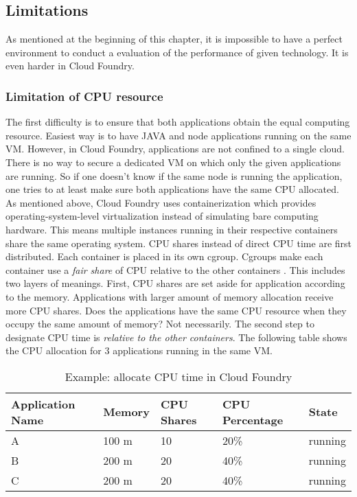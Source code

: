 \subsection{Limitations}
As mentioned at the beginning of this chapter, it is impossible to have a perfect environment to conduct a evaluation of the performance of given technology. It is even harder in Cloud Foundry. \\
\subsubsection{Limitation of CPU resource}
The first difficulty is to ensure that both applications obtain the equal computing resource. Easiest way is to have JAVA and node applications running on the same VM. However, in Cloud Foundry, applications are not confined to a single cloud. There is no way to secure a dedicated VM on which only the given applications are running. So if one doesn't know if the same node is running the application, one tries to at least make sure both applications have the same CPU allocated. As mentioned above, Cloud Foundry uses containerization which provides operating-system-level virtualization instead of simulating bare computing hardware. This means multiple instances running in their respective containers share the same operating system. CPU shares instead of direct CPU time are first distributed. Each container is placed in its own cgroup. Cgroups make each container use a \textit{fair share} of CPU relative to the other containers \citep{CGroup}. This includes two layers of meanings. First, CPU shares are set aside for application according to the memory. Applications with larger amount of memory allocation receive more CPU shares. Does the applications have the same CPU resource when they occupy the same amount of memory? Not necessarily. The second step to designate CPU time is \textit{relative to the other containers}. The following table shows the CPU allocation for 3 applications running in the same VM. 
\begin{table}[h]
	\caption{Example: allocate CPU time in Cloud Foundry}
	\label{Kap2:Kopplungsformen}
	\renewcommand{\arraystretch}{1.2}
	\centering
	\sffamily
	\begin{footnotesize}
		\begin{tabular}{l l l l l }
			\toprule
			\textbf{Application Name} & \textbf{Memory} & \textbf{CPU Shares}& \textbf{CPU Percentage} }& \textbf{State}\\
			\midrule
		    A 	&	100	m & 10 & 20\%   & running\\
			B	&	200 m & 20 & 40\% & running\\
			C	&	200 m &	20 & 40\% & running\\
			\bottomrule
		\end{tabular}
	\end{footnotesize}
	\rmfamily
\end{table}

